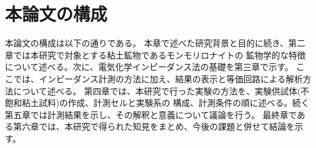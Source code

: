 \section{本論文の構成}
本論文の構成は以下の通りである。
本章で述べた研究背景と目的に続き、第二章では本研究で対象とする粘土鉱物であるモンモリロナイトの
鉱物学的な特徴について述べる。次に、電気化学インピーダンス法の基礎を第三章で示す。
ここでは、インピーダンス計測の方法に加え、結果の表示と等価回路による解析方法について述べる。
第四章では、本研究で行った実験の方法を、実験供試体(不飽和粘土試料)の作成、計測セルと実験系の
構成、計測条件の順に述べる。続く第五章では計測結果を示し、その解釈と意義について議論を行う。
最終章である第六章では、本研究で得られた知見をまとめ、今後の課題と併せて結論を示す。


